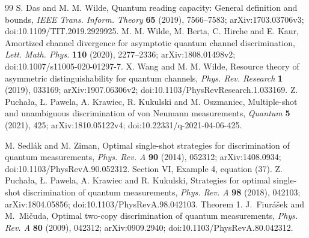 \begin{thebibliography}{99}
 S. Das and M. M. Wilde,
Quantum reading capacity: General definition and bounds,
\emph{IEEE Trans. Inform. Theory} \textbf{65} (2019), 7566--7583;
arXiv:1703.03706v3; doi:10.1109/TIT.2019.2929925.
 M. M. Wilde, M. Berta, C. Hirche and E. Kaur,
Amortized channel divergence for asymptotic quantum channel discrimination,
\emph{Lett. Math. Phys.} \textbf{110} (2020), 2277--2336;
arXiv:1808.01498v2; doi:10.1007/s11005-020-01297-7.
 X. Wang and M. M. Wilde,
Resource theory of asymmetric distinguishability for quantum channels,
\emph{Phys. Rev. Research} \textbf{1} (2019), 033169;
arXiv:1907.06306v2; doi:10.1103/PhysRevResearch.1.033169.
 Z. Pucha\l a, \L. Pawela, A. Krawiec, R. Kukulski and
M. Oszmaniec, Multiple-shot and unambiguous discrimination of von Neumann
measurements, \emph{Quantum} \textbf{5} (2021), 425;
arXiv:1810.05122v4; doi:10.22331/q-2021-04-06-425.


 M. Sedl\'ak and M. Ziman,
Optimal single-shot strategies for discrimination of quantum measurements,
\emph{Phys. Rev. A} \textbf{90} (2014), 052312;
arXiv:1408.0934; doi:10.1103/PhysRevA.90.052312.
Section VI, Example 4, equation (37).
 Z. Pucha\l a, \L. Pawela, A. Krawiec and R. Kukulski,
Strategies for optimal single-shot discrimination of quantum measurements,
\emph{Phys. Rev. A} \textbf{98} (2018), 042103;
arXiv:1804.05856; doi:10.1103/PhysRevA.98.042103. Theorem 1.
 J.~Fiur\'a\v sek and M.~Mi\v cuda,
Optimal two-copy discrimination of quantum measurements,
\emph{Phys. Rev. A} \textbf{80} (2009), 042312;
arXiv:0909.2940; doi:10.1103/PhysRevA.80.042312.


\end{thebibliography}
